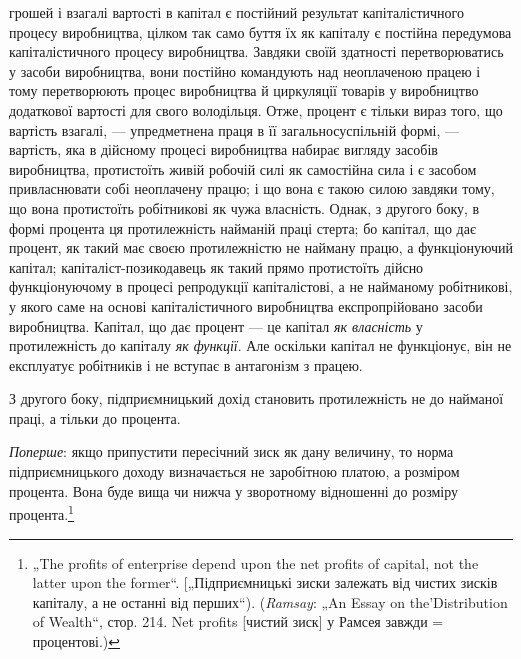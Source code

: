 \parcont{}  %
грошей і взагалі вартості в капітал є постійний результат капіталістичного
процесу виробництва, цілком так само буття їх
як капіталу є постійна передумова капіталістичного процесу
виробництва. Завдяки своїй здатності перетворюватись у засоби
виробництва, вони постійно командують над неоплаченою
працею і тому перетворюють процес виробництва й циркуляції
товарів у виробництво додаткової вартості для свого володільця.
Отже, процент є тільки вираз того, що вартість взагалі, —
упредметнена праця в її загальносуспільній формі, — вартість,
яка в дійсному процесі виробництва набирає вигляду засобів виробництва,
протистоїть живій робочій силі як самостійна сила
і є засобом привласнювати собі неоплачену працю; і що вона є такою
силою завдяки тому, що вона протистоїть робітникові як
чужа власність. Однак, з другого боку, в формі процента ця
протилежність найманій праці стерта; бо капітал, що дає процент,
як такий має своєю протилежністю не найману працю,
а функціонуючий капітал; капіталіст-позикодавець як такий прямо
протистоїть дійсно функціонуючому в процесі репродукції капіталістові,
а не найманому робітникові, у якого саме на основі
капіталістичного виробництва експропрійовано засоби виробництва.
Капітал, що дає процент — це капітал \emph{як власність} у
протилежність до капіталу \emph{як функції}. Але оскільки капітал
не функціонує, він не експлуатує робітників і не вступає в антагонізм
з працею.

З другого боку, підприємницький дохід становить протилежність
не до найманої праці, а тільки до процента.

\emph{Поперше}: якщо припустити пересічний зиск як дану величину,
то норма підприємницького доходу визначається не заробітною
платою, а розміром процента. Вона буде вища чи нижча
у зворотному відношенні до розміру процента.\footnote{
„The profits of enterprise depend upon the net profits of capital, not the
latter upon the former“. [„Підприємницькі зиски залежать від чистих зисків капіталу,
а не останні від перших“). (\emph{Ramsay}: „An Essay on the'Distribution of Wealth“,
стор. 214. Net profits [чистий зиск] у Рамсея завжди = процентові.)
}

